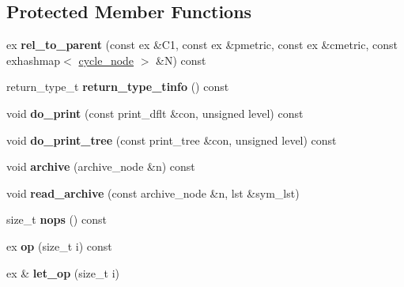 \subsection*{Protected Member Functions}
\begin{DoxyCompactItemize}
\item 
\mbox{\label{class_moeb_inv_1_1cycle__relation_a9425b2b5b05fa2f701cd9ff769403efe}} 
ex {\bfseries rel\+\_\+to\+\_\+parent} (const ex \&C1, const ex \&pmetric, const ex \&cmetric, const exhashmap$<$ \mbox{\hyperlink{class_moeb_inv_1_1cycle__node}{cycle\+\_\+node}} $>$ \&N) const
\item 
\mbox{\label{class_moeb_inv_1_1cycle__relation_aaba7256a95da266cc70e21ea3a2909bb}} 
return\+\_\+type\+\_\+t {\bfseries return\+\_\+type\+\_\+tinfo} () const
\item 
\mbox{\label{class_moeb_inv_1_1cycle__relation_a86492bca17669791dc9ed1a4b4437f70}} 
void {\bfseries do\+\_\+print} (const print\+\_\+dflt \&con, unsigned level) const
\item 
\mbox{\label{class_moeb_inv_1_1cycle__relation_a601b511cf18754e68c02b090d583f05a}} 
void {\bfseries do\+\_\+print\+\_\+tree} (const print\+\_\+tree \&con, unsigned level) const
\item 
\mbox{\label{class_moeb_inv_1_1cycle__relation_aacb68be8d562ef4abd38b97b4bb21198}} 
void {\bfseries archive} (archive\+\_\+node \&n) const
\item 
\mbox{\label{class_moeb_inv_1_1cycle__relation_add29cbea61272e7e87ef6e23539fb6a9}} 
void {\bfseries read\+\_\+archive} (const archive\+\_\+node \&n, lst \&sym\+\_\+lst)
\item 
\mbox{\label{class_moeb_inv_1_1cycle__relation_a0179243f66e4c3d33278e0687cb2b6e4}} 
size\+\_\+t {\bfseries nops} () const
\item 
\mbox{\label{class_moeb_inv_1_1cycle__relation_afe4e9cb71d813b65194503bafe94dc6b}} 
ex {\bfseries op} (size\+\_\+t i) const
\item 
\mbox{\label{class_moeb_inv_1_1cycle__relation_a27c13bcd919ee4b852f7a0a2a4acfb94}} 
ex \& {\bfseries let\+\_\+op} (size\+\_\+t i)
\end{DoxyCompactItemize}
